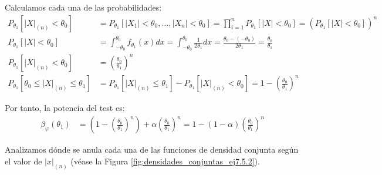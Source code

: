 \begin{ejercicio}
\begin{description}
        Calculamos cada una de las probabilidades:
        \begin{align*}
            P_{\theta_1}[|X|_{(n)} < \theta_0] &= P_{\theta_1}[|X_1| < \theta_0, \ldots, |X_n| < \theta_0] = \prod_{i=1}^{n} P_{\theta_1}[|X| < \theta_0] = \left(P_{\theta_1}[|X| < \theta_0]\right)^n\\
            P_{\theta_1}[|X| < \theta_0] &= \int_{-\theta_0}^{\theta_0} f_{\theta_1}(x) dx = \int_{-\theta_0}^{\theta_0} \frac{1}{2\theta_1} dx = \frac{\theta_0 - (-\theta_0)}{2\theta_1} = \frac{\theta_0}{\theta_1}\\
            P_{\theta_1}[|X|_{(n)} < \theta_0] &= \left(\frac{\theta_0}{\theta_1}\right)^n\\
            P_{\theta_1}[\theta_0 \leq |X|_{(n)} \leq \theta_1] &= P_{\theta_1}[|X|_{(n)} \leq \theta_1] - P_{\theta_1}[|X|_{(n)} < \theta_0] = 1 - \left(\frac{\theta_0}{\theta_1}\right)^n
        \end{align*}

        Por tanto, la potencia del test es:
        \begin{align*}
            \beta_\varphi(\theta_1) &= \left(1-\left(\frac{\theta_0}{\theta_1}\right)^n\right) + \alpha \left(\frac{\theta_0}{\theta_1}\right)^n = 1 - (1-\alpha)\left(\frac{\theta_0}{\theta_1}\right)^n
        \end{align*}

        \item[Caso $\theta_0 > \theta_1$.] Analizamos dónde se anula cada una de las funciones de densidad conjunta según el valor de $|x|_{(n)}$ (véase la Figura \ref{fig:densidades_conjuntas_ej7.5.2}).
        \begin{figure}[h]
            \centering
\end{figure}
\end{description}
\end{ejercicio}
